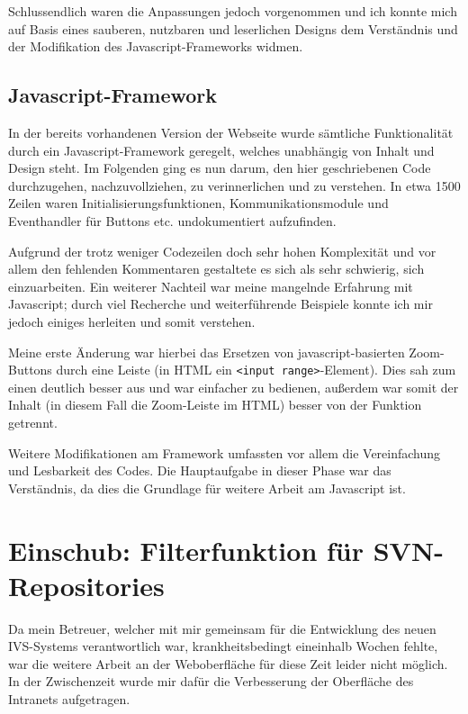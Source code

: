 \documentclass[xcolor=dvipsnames,11pt,paper=a4paper]{report}
\begin{document}
Schlussendlich waren die Anpassungen jedoch vorgenommen und ich konnte mich auf
Basis eines sauberen, nutzbaren und leserlichen Designs dem Verständnis und der
Modifikation des Javascript-Frameworks widmen.


\subsection{Javascript-Framework}

In der bereits vorhandenen Version der Webseite wurde sämtliche Funktionalität durch
ein Javascript-Framework geregelt, welches unabhängig von Inhalt und Design steht.
Im Folgenden ging es nun darum, den hier geschriebenen Code durchzugehen, nachzuvollziehen,
zu verinnerlichen und zu verstehen. In etwa 1500 Zeilen waren Initialisierungsfunktionen,
Kommunikationsmodule und Eventhandler für Buttons etc. undokumentiert aufzufinden.

Aufgrund der trotz weniger Codezeilen doch sehr hohen Komplexität und vor allem
den fehlenden Kommentaren gestaltete es sich als sehr schwierig, sich einzuarbeiten.
Ein weiterer Nachteil war meine mangelnde Erfahrung mit Javascript; durch viel Recherche
und weiterführende Beispiele konnte ich mir jedoch einiges herleiten und somit verstehen.

Meine erste Änderung war hierbei das Ersetzen von javascript-basierten Zoom-Buttons
durch eine Leiste (in HTML ein \texttt{<input range>}-Element). Dies sah zum einen
deutlich besser aus und war einfacher zu bedienen, außerdem war somit der Inhalt
(in diesem Fall die Zoom-Leiste im HTML) besser von der Funktion getrennt.

Weitere Modifikationen am Framework umfassten vor allem die Vereinfachung und Lesbarkeit
des Codes. Die Hauptaufgabe in dieser Phase war das Verständnis, da dies die Grundlage
für weitere Arbeit am Javascript ist.



\section{Einschub: Filterfunktion für SVN-Repositories}

Da mein Betreuer, welcher mit mir gemeinsam für die Entwicklung des neuen IVS-Systems
verantwortlich war, krankheitsbedingt eineinhalb Wochen fehlte, war die weitere
Arbeit an der Weboberfläche für diese Zeit leider nicht möglich. In der Zwischenzeit
wurde mir dafür die Verbesserung der Oberfläche des Intranets aufgetragen.
\end{document}
